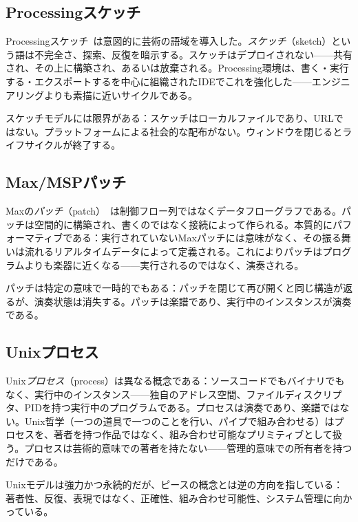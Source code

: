 \documentclass[10pt,letterpaper,twocolumn]{article}
\begin{document}
\subsection{Processingスケッチ}

Processingスケッチ~\citep{reas2007processing}は意図的に芸術の語域を導入した。\emph{スケッチ}（sketch）という語は不完全さ、探索、反復を暗示する。スケッチはデプロイされない——共有され、その上に構築され、あるいは放棄される。Processing環境は、書く・実行する・エクスポートするを中心に組織されたIDEでこれを強化した——エンジニアリングよりも素描に近いサイクルである。

スケッチモデルには限界がある：スケッチはローカルファイルであり、URLではない。プラットフォームによる社会的な配布がない。ウィンドウを閉じるとライフサイクルが終了する。

\subsection{Max/MSPパッチ}

Maxの\emph{パッチ}（patch）~\citep{puckette1988patcher,puckette1996pure}は制御フロー列ではなくデータフローグラフである。パッチは空間的に構築され、書くのではなく接続によって作られる。本質的にパフォーマティブである：実行されていないMaxパッチには意味がなく、その振る舞いは流れるリアルタイムデータによって定義される。これによりパッチはプログラムよりも楽器に近くなる——実行されるのではなく、演奏される。

パッチは特定の意味で一時的でもある：パッチを閉じて再び開くと同じ構造が返るが、演奏状態は消失する。パッチは楽譜であり、実行中のインスタンスが演奏である。

\subsection{Unixプロセス}

Unix\emph{プロセス}（process）は異なる概念である：ソースコードでもバイナリでもなく、実行中のインスタンス——独自のアドレス空間、ファイルディスクリプタ、PIDを持つ実行中のプログラムである。プロセスは演奏であり、楽譜ではない。Unix哲学（一つの道具で一つのことを行い、パイプで組み合わせる）はプロセスを、著者を持つ作品ではなく、組み合わせ可能なプリミティブとして扱う。プロセスは芸術的意味での著者を持たない——管理的意味での所有者を持つだけである。

Unixモデルは強力かつ永続的だが、ピースの概念とは逆の方向を指している：著者性、反復、表現ではなく、正確性、組み合わせ可能性、システム管理に向かっている。
\end{document}
